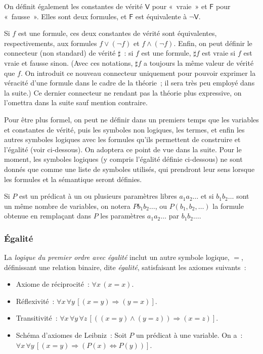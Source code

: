On définit également les constantes de vérité $\mathsf{V}$ pour « vraie » et $\mathsf{F}$ pour « fausse ». 
Elles sont deux formules, et $\mathsf{F}$ est équivalente à $\neg \mathsf{V}$.

Si $f$ est une formule, ces deux constantes de vérité sont équivalentes, respectivements, aux formules $f \vee (\neg f)$ et $f \wedge (\neg f)$. 
Enfin, on peut définir le connecteur (non standard) de vérité $\sharp$ : si $f$ est une formule, $\sharp f$ est vraie si $f$ est vraie et fausse sinon. 
(Avec ces notations, $\sharp f$ a toujours la même valeur de vérité que $f$. 
On introduit ce nouveau connecteur uniquement pour pouvoir exprimer la véracité d'une formule dans le cadre de la théorie ; il sera très peu employé dans la suite.)
Ce dernier connecteur ne rendant pas la théorie plus expressive, on l'omettra dans la suite sauf mention contraire.

Pour être plus formel, on peut ne définir dans un premiers temps que les variables et constantes de vérité, puis les symboles non logiques, les termes, et enfin les autres symboles logiques avec les formules qu'ils permettent de construire et l'égalité (voir ci-dessous). 
On adoptera ce point de vue dans la suite. 
Pour le moment, les symboles logiques (y compris l'égalité définie ci-dessous) ne sont donnés que comme une liste de symboles utilisés, qui prendront leur sens lorsque les formules et la sémantique seront définies.

Si $P$ est un prédicat à un ou plusieurs paramètres libres $a_1 a_2 \dots$ et si $b_1 b_2 \dots$ sont un même nombre de variables, on notera $P b_1 b_2 \dots$, ou $P(b_1, b_2, \dots)$ la formule obtenue en remplaçant dans $P$ les paramètres $a_1 a_2 \dots$ par $b_1 b_2 \dots$.

\subsubsection{Égalité} 

La \textit{logique du premier ordre avec égalité} inclut un autre symbole logique, $=$, définissant une relation binaire, dite \textit{égalité}, satisfaisant les axiomes suivants : 
\begin{itemize}
    \item Axiome de réciprocité : $\forall x \, (x = x)$. 
    \item Réflexivité : $\forall x \, \forall y \, [ (x=y) \Rightarrow (y=x) ]$.
    \item Transitivité : $\forall x \, \forall y \, \forall z \, [((x=y) \wedge (y=z)) \Rightarrow (x=z)]$.
    \item Schéma d'axiomes de Leibniz : Soit $P$ un prédicat à une variable. On a : $\forall x \, \forall y \, [ (x = y) \Rightarrow (P(x) \Leftrightarrow P(y))]$.
\end{itemize}

